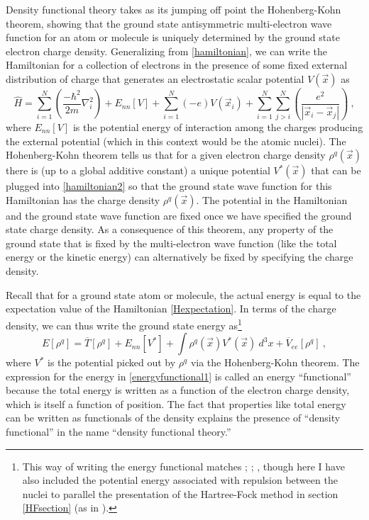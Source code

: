 \documentclass[12pt,onecolumn,secnumarabic,amsmath,amssymb,balancelastpage,nofootinbib]{article}
\begin{document}
Density functional theory takes as its jumping off point the Hohenberg-Kohn theorem, showing that the ground state antisymmetric multi-electron wave function for an atom or molecule is uniquely determined by the ground state electron charge density.  Generalizing from \eqref{hamiltonian}, we can write the Hamiltonian for a collection of electrons in the presence of some fixed external distribution of charge that generates an electrostatic scalar potential $V(\vec{x})$ as
\begin{equation}
\widehat{H}= \sum_{i=1}^{N}\left(\frac{-\hbar^2}{2 m} \nabla_i^2 \right)  + E_{nn}[V] + \sum_{i=1}^{N}(-e)V(\vec{x}_i) + \sum_{i=1}^{N}\sum_{j>i}^{N}\left(\frac{e^2}{|\vec{x}_i-\vec{x}_j|}\right)
\ ,
\label{hamiltonian2}
\end{equation}
where $E_{nn}[V]$ is the potential energy of interaction among the charges producing the external potential (which in this context would be the atomic nuclei).  The Hohenberg-Kohn theorem tells us that for a given electron charge density $\rho^q(\vec{x})$ there is (up to a global additive constant) a unique potential $V^*(\vec{x})$ that can be plugged into \eqref{hamiltonian2} so that the ground state wave function for this Hamiltonian has the charge density $\rho^q(\vec{x})$.  The potential in the Hamiltonian and the ground state wave function are fixed once we have specified the ground state charge density.  As a consequence of this theorem, any property of the ground state that is fixed by the multi-electron wave function (like the total energy or the kinetic energy) can alternatively be fixed by specifying the charge density.

Recall that for a ground state atom or molecule, the actual energy is equal to the expectation value of the Hamiltonian \eqref{Hexpectation}.  In terms of the charge density, we can thus write the ground state energy as\footnote{This way of writing the energy functional matches \cite[eq.\ 3.2.3]{parryang}; \cite[eq.\ 9.36]{atkins2011}; \cite[eq.\ 16.36]{levineQC}, though here I have also included the potential energy associated with repulsion between the nuclei to parallel the presentation of the Hartree-Fock method in section \ref{HFsection} (as in \cite[eq.\ 6.12]{martin2004}).}
\begin{equation}
E[\rho^q]=\overline{T}[\rho^q]+E_{nn}[V^*]+\int{\rho^q(\vec{x}) V^*(\vec{x}) \  d^3 x}+\overline{V}_{ee}[\rho^q]
\ ,
\label{energyfunctional1}
\end{equation}
where $V^*$ is the potential picked out by $\rho^q$ via the Hohenberg-Kohn theorem.  The expression for the energy in \eqref{energyfunctional1} is called an energy ``functional'' because the total energy is written as a function of the electron charge density, which is itself a function of position.  The fact that properties like total energy can be written as functionals of the density explains the presence of ``density functional'' in the name ``density functional theory.''
\end{document}
